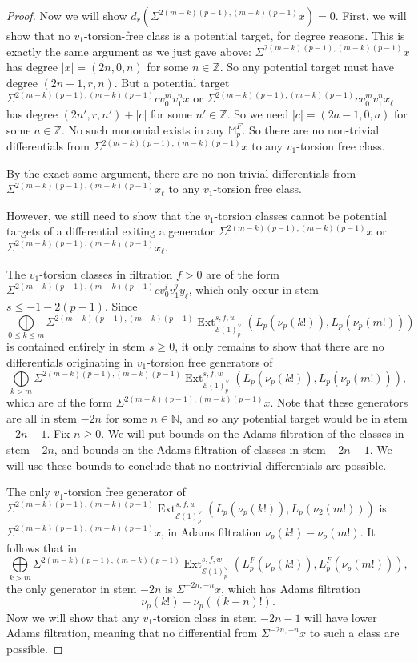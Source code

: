 \documentclass{amsart}
\theoremstyle{plain}
\numberwithin{theorem}{section}
\numberwithin{equation}{section}
\numberwithin{figure}{section}
\DeclareMathOperator{\Ext}{Ext}
\newcommand{\0}{\langle 0 \rangle }
\begin{document}
\begin{proof}
Now we will show $d_r(\Sigma^{2(m-k)(p-1), (m-k)(p-1)}x) = 0$. First, we will show that no $v_1$-torsion-free class is a potential target, for degree reasons. This is exactly the same argument as we just gave above: $\Sigma^{2(m-k)(p-1), (m-k)(p-1)} x$ has degree $|x| = (2n,0,n)$ for some $n \in \mathbb{Z}$. So any potential target must have degree $(2n-1,r,n)$. But a potential target $\Sigma^{2(m-k)(p-1), (m-k)(p-1)} c v_0^m v_1^nx$ or $\Sigma^{2(m-k)(p-1), (m-k)(p-1)} c v_0^m v_1^nx_\ell$ has degree $(2n', r, n') + |c|$ for some $n' \in \mathbb{Z}$. So we need $|c| = (2a-1,0,a)$ for some $a \in \mathbb{Z}$. No such monomial exists in any $\mathbb{M}_p^F$. So there are no non-trivial differentials from $\Sigma^{2(m-k)(p-1), (m-k)(p-1)}x$ to any $v_1$-torsion free class. 

By the exact same argument, there are no non-trivial differentials from $\Sigma^{2(m-k)(p-1), (m-k)(p-1)}x_\ell$ to any $v_1$-torsion free class. 

However, we still need to show that the $v_1$-torsion classes cannot be potential targets of a differential exiting a generator $\Sigma^{2(m-k)(p-1), (m-k)(p-1)} x$ or $\Sigma^{2(m-k)(p-1), (m-k)(p-1)} x_\ell$. 

The $v_1$-torsion classes in filtration $f > 0$ are of the form $\Sigma^{2(m-k)(p-1), (m-k)(p-1)}cv_0^iv_1^jy_{\ell}$, which only occur in stem $s \le -1 - 2(p-1)$. Since 
\[
\bigoplus\limits_{0 \le k \le m} \Sigma^{2(m-k)(p-1), (m-k)(p-1)}\Ext^{s,f,w}_{\mathcal{E}(1)_p^\vee}( L_p (\nu_{p}(k!) ), L_p (\nu_{p}(m!) ) )
\]
is contained entirely in stem $s \ge 0$, it only remains to show that there are no differentials originating in $v_1$-torsion free generators of
\[
\bigoplus\limits_{k > m}\Sigma^{2(m-k)(p-1), (m-k)(p-1)}\Ext^{s,f,w}_{\mathcal{E}(1)_p^\vee}( L_p(\nu_{p}(k!) ), L_p(\nu_{p}(m!) ) )
,\]
which are of the form $\Sigma^{2(m-k)(p-1),(m-k)(p-1)}x$.
Note that these generators are all in stem $-2n$ for some $n \in \mathbb{N}$, and so any potential target would be in stem $-2n-1$. Fix $n \ge 0$. We will put bounds on the Adams filtration of the classes in stem $-2n$, and bounds on the Adams filtration of classes in stem $-2n-1$. We will use these bounds to conclude that no nontrivial differentials are possible. 

The only $v_{1}$-torsion free generator of $\Sigma^{2(m-k)(p-1), (m-k)(p-1)} \Ext^{s,f,w}_{\mathcal{E}(1)_p^\vee}\left(L_p(\nu_{p}(k!)), L_p(\nu_{2}(m!))\right)$ is $\Sigma^{2(m-k)(p-1), (m-k)(p-1)}x$, in Adams filtration $\nu_p(k!)-\nu_p(m!).$ It follows that in \[
\bigoplus\limits_{k > m}\Sigma^{2(m-k)(p-1), (m-k)(p-1)}\Ext^{s,f,w}_{\mathcal{E}(1)_p^\vee}( L_p^F (\nu_{p}(k!) ), L_p^F (\nu_{p}(m!) ) )
,\]
the only generator in stem $-2n$ is $\Sigma^{-2n,-n}x$, which has Adams filtration \[\nu_{p}(k!) - \nu_{p}((k-n)!).\] Now we will show that any $v_1$-torsion class in stem $-2n-1$ will have lower Adams filtration, meaning that no differential from $\Sigma^{-2n,-n}x$ to such a class are possible. 


\end{proof}
\end{document}
